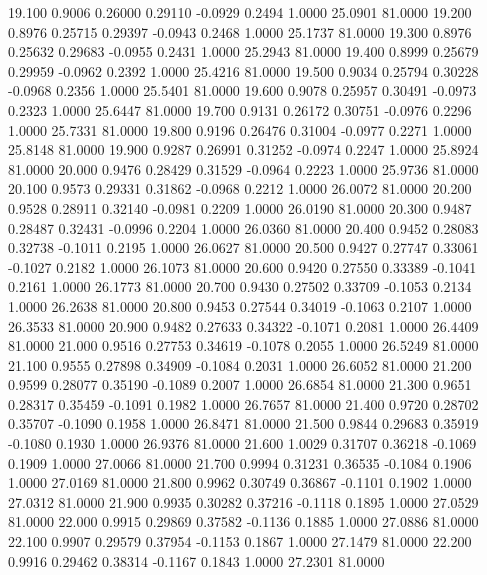   19.100   0.9006   0.26000   0.29110  -0.0929   0.2494   1.0000  25.0901  81.0000
  19.200   0.8976   0.25715   0.29397  -0.0943   0.2468   1.0000  25.1737  81.0000
  19.300   0.8976   0.25632   0.29683  -0.0955   0.2431   1.0000  25.2943  81.0000
  19.400   0.8999   0.25679   0.29959  -0.0962   0.2392   1.0000  25.4216  81.0000
  19.500   0.9034   0.25794   0.30228  -0.0968   0.2356   1.0000  25.5401  81.0000
  19.600   0.9078   0.25957   0.30491  -0.0973   0.2323   1.0000  25.6447  81.0000
  19.700   0.9131   0.26172   0.30751  -0.0976   0.2296   1.0000  25.7331  81.0000
  19.800   0.9196   0.26476   0.31004  -0.0977   0.2271   1.0000  25.8148  81.0000
  19.900   0.9287   0.26991   0.31252  -0.0974   0.2247   1.0000  25.8924  81.0000
  20.000   0.9476   0.28429   0.31529  -0.0964   0.2223   1.0000  25.9736  81.0000
  20.100   0.9573   0.29331   0.31862  -0.0968   0.2212   1.0000  26.0072  81.0000
  20.200   0.9528   0.28911   0.32140  -0.0981   0.2209   1.0000  26.0190  81.0000
  20.300   0.9487   0.28487   0.32431  -0.0996   0.2204   1.0000  26.0360  81.0000
  20.400   0.9452   0.28083   0.32738  -0.1011   0.2195   1.0000  26.0627  81.0000
  20.500   0.9427   0.27747   0.33061  -0.1027   0.2182   1.0000  26.1073  81.0000
  20.600   0.9420   0.27550   0.33389  -0.1041   0.2161   1.0000  26.1773  81.0000
  20.700   0.9430   0.27502   0.33709  -0.1053   0.2134   1.0000  26.2638  81.0000
  20.800   0.9453   0.27544   0.34019  -0.1063   0.2107   1.0000  26.3533  81.0000
  20.900   0.9482   0.27633   0.34322  -0.1071   0.2081   1.0000  26.4409  81.0000
  21.000   0.9516   0.27753   0.34619  -0.1078   0.2055   1.0000  26.5249  81.0000
  21.100   0.9555   0.27898   0.34909  -0.1084   0.2031   1.0000  26.6052  81.0000
  21.200   0.9599   0.28077   0.35190  -0.1089   0.2007   1.0000  26.6854  81.0000
  21.300   0.9651   0.28317   0.35459  -0.1091   0.1982   1.0000  26.7657  81.0000
  21.400   0.9720   0.28702   0.35707  -0.1090   0.1958   1.0000  26.8471  81.0000
  21.500   0.9844   0.29683   0.35919  -0.1080   0.1930   1.0000  26.9376  81.0000
  21.600   1.0029   0.31707   0.36218  -0.1069   0.1909   1.0000  27.0066  81.0000
  21.700   0.9994   0.31231   0.36535  -0.1084   0.1906   1.0000  27.0169  81.0000
  21.800   0.9962   0.30749   0.36867  -0.1101   0.1902   1.0000  27.0312  81.0000
  21.900   0.9935   0.30282   0.37216  -0.1118   0.1895   1.0000  27.0529  81.0000
  22.000   0.9915   0.29869   0.37582  -0.1136   0.1885   1.0000  27.0886  81.0000
  22.100   0.9907   0.29579   0.37954  -0.1153   0.1867   1.0000  27.1479  81.0000
  22.200   0.9916   0.29462   0.38314  -0.1167   0.1843   1.0000  27.2301  81.0000
